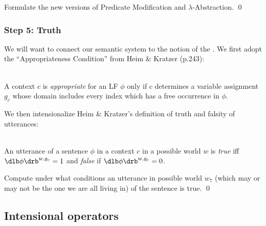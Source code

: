 \begin{exercise}
  Formulate the new versions of Predicate Modification and
  \(\lambda\)-Abstraction. \qed
\end{exercise}

\subsubsection{Step 5: Truth} \label{sec:truth}

We will want to connect our semantic system to the notion of the . We first adopt the ``Appropriateness Condition'' from Heim \&
Kratzer (p.243):

\ex {}\\
A context $c$ is \emph{appropriate} for an LF $\phi$ only if $c$
determines a variable assignment $g_c$ whose domain includes every
index which has a free occurrence in $\phi$. \xe

\kwn
We then intensionalize Heim \& Kratzer's definition of truth and falsity of
utterances:

\ex {}\\
An utterance of a sentence $\phi$ in a context $c$ in a possible world $w$ is
\emph{true} iff $\sv{\phi}^{w,g_c} = 1$ and \emph{false} if $\sv{\phi}^{w,g_c} =
0$.
\xe

\begin{exercise}
  Compute under what conditions an utterance in possible world $w_7$ (which may
  or may not be the one we are all living in) of the sentence  is true. \qed
\end{exercise}

\subsection{Intensional operators} \label{sec:intens-oper}

